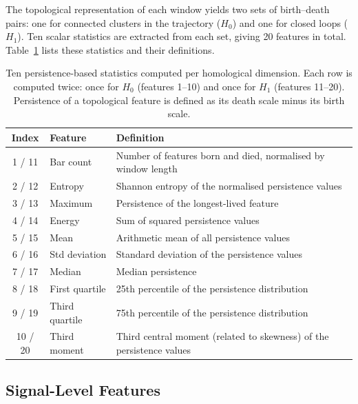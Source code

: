 The topological representation of each window yields two sets of birth--death pairs: one for connected clusters in the trajectory ($H_0$) and one for closed loops ($H_1$). Ten scalar statistics are extracted from each set, giving 20 features in total. Table~\ref{tab:ph_features} lists these statistics and their definitions.

\begin{table}[h!]
\centering
\caption{Ten persistence-based statistics computed per homological dimension.
  Each row is computed twice: once for $H_0$ (features 1--10) and once for $H_1$
  (features 11--20).  Persistence of a topological feature is defined as its
  death scale minus its birth scale.}
\label{tab:ph_features}
\small
\begin{tabular}{clp{8cm}}
\toprule
\textbf{Index} & \textbf{Feature} & \textbf{Definition} \\
\midrule
1 / 11  & Bar count          & Number of features born and died, normalised by window length \\
2 / 12  & Entropy            & Shannon entropy of the normalised persistence values \\
3 / 13  & Maximum            & Persistence of the longest-lived feature \\
4 / 14  & Energy             & Sum of squared persistence values \\
5 / 15  & Mean               & Arithmetic mean of all persistence values \\
6 / 16  & Std deviation      & Standard deviation of the persistence values \\
7 / 17  & Median             & Median persistence \\
8 / 18  & First quartile     & 25th percentile of the persistence distribution \\
9 / 19  & Third quartile     & 75th percentile of the persistence distribution \\
10 / 20 & Third moment       & Third central moment (related to skewness) of the persistence values \\
\bottomrule
\end{tabular}
\end{table}

\subsection{Signal-Level Features}
\label{subsubsec:signal_features}

